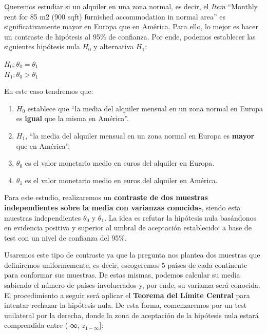 \documentclass[
]{article}
\begin{document}
\hfill\break

Queremos estudiar si un alquiler en una zona normal, es decir, el
\emph{Item} ``Monthly rent for 85 m2 (900 sqft) furnished accommodation
in normal area'' es significativamente mayor en Europa que en América.
Para ello, lo mejor es hacer un contraste de hipótesis al 95\% de
confianza. Por ende, podemos establecer las siguientes hipótesis nula
\(H_{0}\) y alternativa \(H_{1}\):

\(H_{0}: \theta_{0}=\theta_{1}\)\\
\(H_{1}: \theta_{0}>\theta_{1}\)

En este caso tendremos que:

\begin{enumerate}
\def\labelenumi{\arabic{enumi}.}
\item
  \(H_{0}\) establece que ``la media del alquiler mensual en un zona
  normal en Europa es \textbf{igual} que la misma en América''.
\item
  \(H_{1}\), ``la media del alquiler mensual en un zona normal en Europa
  es \textbf{mayor} que en América''.
\item
  \(\theta_{0}\) es el valor monetario medio en euros del alquiler en
  Europa.
\item
  \(\theta_{1}\) es el valor monetario medio en euros del alquiler en
  América.
\end{enumerate}

Para este estudio, realizaremos un \textbf{contraste de dos muestras
independientes sobre la media con varianzas conocidas}, siendo esta
muestras independientes \(\theta_{0}\) y \(\theta_{1}\). La idea es
refutar la hipótesis nula basándonos en evidencia positiva y superior al
umbral de aceptación establecido: a base de test con un nivel de
confianza del 95\%.

Usaremos este tipo de contraste ya que la pregunta nos plantea dos
muestras que definiremos uniformemente, es decir, escogeremos 5 países
de cada continente para conformar sus muestras. De estas mismas, podemos
calcular su media sabiendo el número de países involucrados y, por ende,
su varianza será conocida. El procedimiento a seguir será aplicar el
\textbf{Teorema del Límite Central} para intentar rechazar la hipótesis
nula. De esta forma, comenzaremos por un test unilateral por la derecha,
donde la zona de aceptación de la hipótesis nula estará comprendida
entre (-∞, \(z_{1-∞}\){]}:
\end{document}
